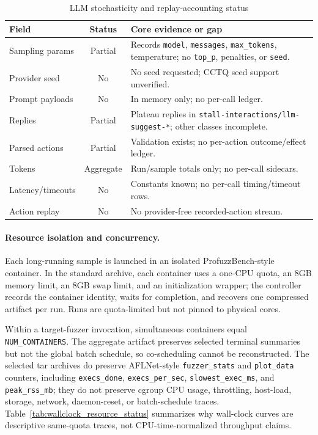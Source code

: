 \documentclass[final,5p,times,number]{elsarticle}
\begin{document}
\begin{table}[!t]
\centering
\caption{LLM stochasticity and replay-accounting status}
\label{tab:llm_replay_status}
{\scriptsize
\setlength{\tabcolsep}{3.6pt}
\renewcommand{\arraystretch}{1.05}
\begin{tabular}{@{}>{\raggedright\arraybackslash}p{} c >{\raggedright\arraybackslash}p{}@{}}
\toprule
Field & Status & Core evidence or gap \\
\midrule
Sampling params & Partial & Records \texttt{model}, \texttt{messages}, \texttt{max\_tokens}, temperature; no \texttt{top\_p}, penalties, or \texttt{seed}. \\
Provider seed & No & No seed requested; CCTQ seed support unverified. \\
Prompt payloads & No & In memory only; no per-call ledger. \\
Replies & Partial & Plateau replies in \texttt{stall-interactions/llm-suggest-*}; other classes incomplete. \\
Parsed actions & Partial & Validation exists; no per-action outcome/effect ledger. \\
Tokens & Aggregate & Run/sample totals only; no per-call sidecars. \\
Latency/timeouts & No & Constants known; no per-call timing/timeout rows. \\
Action replay & No & No provider-free recorded-action stream. \\
\bottomrule
\end{tabular}
}
\end{table}

\paragraph{Resource isolation and concurrency.}
Each long-running sample is launched in an isolated ProfuzzBench-style container. In the standard archive, each container uses a one-CPU quota, an 8GB memory limit, an 8GB swap limit, and an initialization wrapper; the controller records the container identity, waits for completion, and recovers one compressed artifact per run. Runs are quota-limited but not pinned to physical cores.

Within a target-fuzzer invocation, simultaneous containers equal \texttt{NUM\_CONTAINERS}. The aggregate artifact preserves selected terminal summaries but not the global batch schedule, so co-scheduling cannot be reconstructed. The selected tar archives do preserve AFLNet-style \texttt{fuzzer\_stats} and \texttt{plot\_data} counters, including \texttt{execs\_done}, \texttt{execs\_per\_sec}, \texttt{slowest\_exec\_ms}, and \texttt{peak\_rss\_mb}; they do not preserve cgroup CPU usage, throttling, host-load, storage, network, daemon-reset, or batch-schedule traces. Table~\ref{tab:wallclock_resource_status} summarizes why wall-clock curves are descriptive same-quota traces, not CPU-time-normalized throughput claims.
\end{document}
